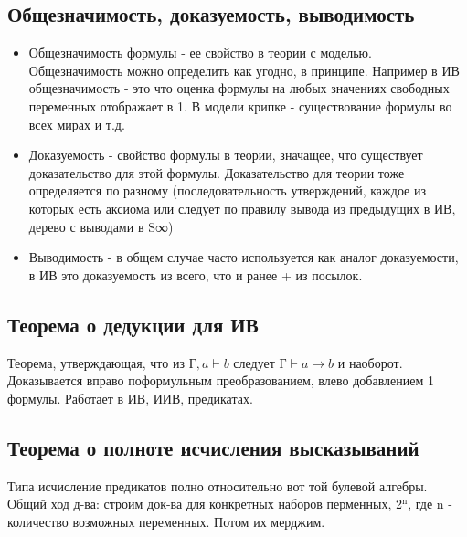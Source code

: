 \documentclass[12pt]{article}
\begin{document}
\subsection{Общезначимость, доказуемость, выводимость}
\label{sec-2-2}
\begin{itemize}
\item Общезначимость формулы - ее свойство в теории с моделью. Общезначимость
можно определить как угодно, в принципе. Например в ИВ общезначимость -
это что оценка формулы на любых значениях свободных переменных отображает
в 1. В модели крипке - существование формулы во всех мирах и т.д.
\item Доказуемость - свойство формулы в теории, значащее, что существует
доказательство для этой формулы. Доказательство для теории тоже определяется
по разному (последовательность утверждений, каждое из которых есть аксиома
или следует по правилу вывода из предыдущих в ИВ, дерево с выводами в S∞)
\item Выводимость - в общем случае часто используется как аналог доказуемости,
в ИВ это доказуемость из всего, что и ранее + из посылок.
\end{itemize}
\subsection{Теорема о дедукции для ИВ}
\label{sec-2-3}
Теорема, утверждающая, что из $Г, a \vdash b$ следует $Г \vdash a \to b$ и наоборот.
Доказывается вправо поформульным преобразованием, влево
добавлением 1 формулы. Работает в ИВ, ИИВ, предикатах.
\subsection{Теорема о полноте исчисления высказываний}
\label{sec-2-4}
Типа исчисление предикатов полно относительно вот той булевой алгебры.
Общий ход д-ва: строим док-ва для конкретных наборов перменных,
2$^{\text{n}}$, где n - количество возможных переменных. Потом их мерджим.
\end{document}
